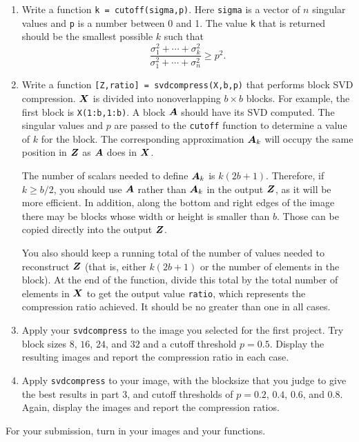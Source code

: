 \documentclass[11pt,twoside]{article}
\begin{document}
\begin{enumerate}
\item Write a function \texttt{k = cutoff(sigma,p)}. Here \texttt{sigma} is a
  vector of $n$ singular values and \texttt{p} is a number between 0
  and 1. The value \texttt{k} that is returned should be the smallest
  possible $k$ such that
  \begin{equation}
    \label{eq:cutoff}
    \frac{ {\sigma_1^2 + \cdots + \sigma_k^2}}{{\sigma_1^2 +
        \cdots + \sigma_n^2}} \ge p^2.
  \end{equation}
\item Write a function \texttt{[Z,ratio] = svdcompress(X,b,p)} that performs
  block SVD compression. $\bm{X}$ is divided into nonoverlapping $b\times
  b$ blocks. For example, the first block is \verb+X(1:b,1:b)+. A
  block $\bm{A}$ should have its SVD computed. The singular values and $p$
  are passed to the \texttt{cutoff} function to determine a value of
  $k$ for the block. The corresponding approximation $\bm{A}_k$ will occupy
  the same position in $\bm{Z}$ as $\bm{A}$ does in $\bm{X}$. 
  
  The number of scalars needed to define $\bm{A}_k$ is $k(2b+1)$.
  Therefore, if $k\ge b/2$, you should use $\bm{A}$ rather than $\bm{A}_k$ in
  the output $\bm{Z}$, as it will be more efficient. In addition, along the
  bottom and right edges of the image there may be blocks whose width
  or height is smaller than $b$. Those can be copied directly into the
  output $\bm{Z}$. 

  You also should keep a running total of the number of values needed
  to reconstruct $\bm{Z}$ (that is, either $k(2b+1)$ or the number of
  elements in the block). At the end of the function, divide this
  total by the total number of elements in $\bm{X}$ to get the output value
  \texttt{ratio}, which represents the compression ratio achieved. It
  should be no greater than one in all cases.
\item Apply your \texttt{svdcompress} to the image you selected for
  the first project. Try block sizes $8$, $16$, $24$, and $32$ and a
  cutoff threshold $p=0.5$. Display the resulting images and report
  the compression ratio in each case.
\item Apply \texttt{svdcompress} to your image, with the blocksize that
  you judge to give the best results in part 3, and cutoff
  thresholds of $p=0.2$, $0.4$, $0.6$, and $0.8$. Again, display the
  images and report the compression ratios.
\end{enumerate}

For your submission, turn in your images and your functions.
\end{document}
